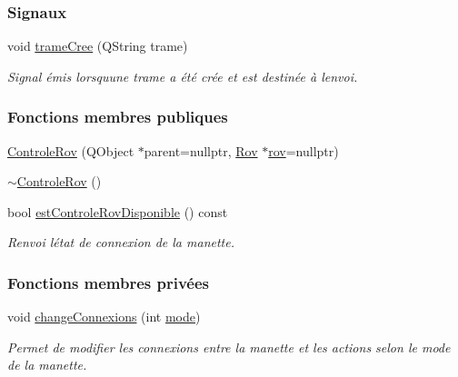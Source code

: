 \subsubsection*{Signaux}
\begin{DoxyCompactItemize}
\item 
void \hyperlink{class_controle_rov_a05506e1d8caf632b0394dcffd365c06f}{trame\+Cree} (Q\+String trame)
\begin{DoxyCompactList}\small\item\em Signal émis lorsqu\textquotesingle{}une trame a été crée et est destinée à l\textquotesingle{}envoi. \end{DoxyCompactList}\end{DoxyCompactItemize}
\subsubsection*{Fonctions membres publiques}
\begin{DoxyCompactItemize}
\item 
\hyperlink{class_controle_rov_acc4d5fea26770217df978d43df2ad51e}{Controle\+Rov} (Q\+Object $\ast$parent=nullptr, \hyperlink{class_rov}{Rov} $\ast$\hyperlink{class_controle_rov_a3620b701fbb3aebe6a57ca3f3f04c6ca}{rov}=nullptr)
\item 
\hyperlink{class_controle_rov_ab216ab83b9dfb738aa240c3846e65d39}{$\sim$\+Controle\+Rov} ()
\item 
bool \hyperlink{class_controle_rov_a9531520e50479fc2e339cd43f4c87066}{est\+Controle\+Rov\+Disponible} () const
\begin{DoxyCompactList}\small\item\em Renvoi l\textquotesingle{}état de connexion de la manette. \end{DoxyCompactList}\end{DoxyCompactItemize}
\subsubsection*{Fonctions membres privées}
\begin{DoxyCompactItemize}
\item 
void \hyperlink{class_controle_rov_a400d5766b9acabb45c1af5f8b22bbe47}{change\+Connexions} (int \hyperlink{class_controle_rov_a5d1fb6ad14da49e3c587199ae86dc28d}{mode})
\begin{DoxyCompactList}\small\item\em Permet de modifier les connexions entre la manette et les actions selon le mode de la manette. \end{DoxyCompactList}\end{DoxyCompactItemize}
